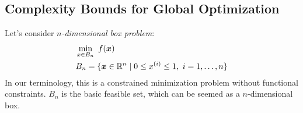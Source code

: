 
\subsection{Complexity Bounds for Global Optimization}\label{subsec:Complexity_Bounds_for_Global_Optimization}

Let's consider \emph{\(n\)-dimensional box problem}:
\begin{equation}\label{eq:n_dimensional_box}
    \begin{aligned}
        & \min_{x \in B_n} ~ f(\bm{x}) \\
        & B_n = \{ \bm{x} \in \mathbb{R}^n \mid 0 \le {x}^{(i)} \le 1, ~ i = 1, \dots, n \}
    \end{aligned}
\end{equation}
In our terminology, this is a constrained minimization problem without functional constraints. \(B_n\) is the basic feasible set, which can be seemed as a \(n\)-dimensional box.

